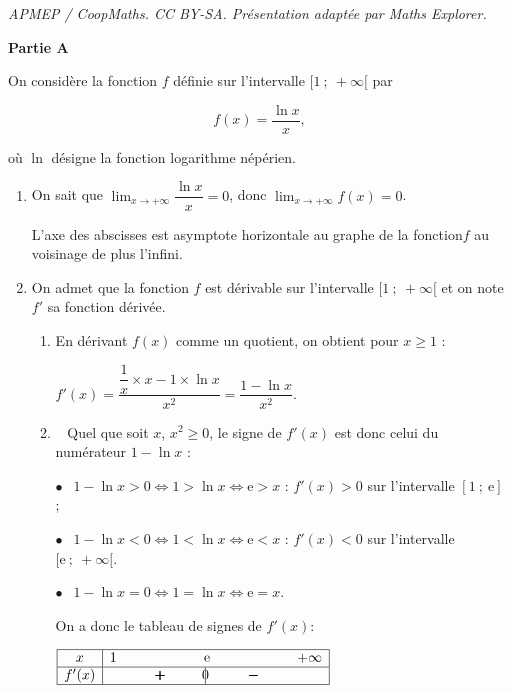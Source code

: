 \documentclass[10pt]{article}
\begin{document}
\noindent\textit{APMEP / CoopMaths. CC BY-SA. Présentation adaptée par Maths Explorer.}\par\medskip
\bigskip

\textbf{Partie A}

\medskip

On considère la fonction $f$ définie sur l'intervalle $[1~;~+\infty[$ par 

\[f(x) = \dfrac{\ln x}{x},\]

où $\ln$ désigne la fonction logarithme népérien.

\medskip

\begin{enumerate}
\item 
On sait que $\displaystyle\lim_{x \to + \infty} \dfrac{\ln x}{x} = 0$, donc $\displaystyle\lim_{x \to + \infty} f(x) = 0$.

L'axe des abscisses est asymptote horizontale au graphe de la fonction$f$ au voisinage de plus l'infini.
\item On admet que la fonction $f$ est dérivable sur l'intervalle $[1~;~+\infty[$ et on note $f'$ sa fonction dérivée.
	\begin{enumerate}
		\item 
En dérivant $f(x)$ comme un quotient, on obtient pour $x \geqslant 1$ :
		
$f'(x) = \dfrac{\dfrac{1}{x} \times x - 1 \times \ln x}{x^2} = \dfrac{1 - \ln x}{x^2}$.

		\item~ 
Quel que soit $x$,\: $x^2 \geqslant 0$, le signe de $f'(x)$ est donc celui du numérateur $1 - \ln x$ :

$\bullet~~$ $1 - \ln x > 0 \iff 1 > \ln x \iff \text{e} > x$ : $f'(x) > 0$ sur l'intervalle $[1~;~\text{e}]$ ;

$\bullet~~$ $1 - \ln x < 0 \iff 1 < \ln x \iff \text{e} < x$ : $f'(x) < 0$ sur l'intervalle $[\text{e}~;~+ \infty[$.

$\bullet~~$ $1 - \ln x = 0 \iff 1 = \ln x \iff \text{e} = x$.

On a donc le tableau de signes de $f'(x)$:

\begin{center}
\renewcommand{\arraystretch}{1.2}
\def\esp{\hspace*{1.5cm}}
$\begin{array}{|c | *{5}{c} |} 
\hline
x  & 1 & \esp & \text e & \esp  & +\infty \\
\hline
f'(x) &  & \pmb{+} &  \vline\hspace{-2.7pt}{0} & \pmb{-} &    \\
\hline
\end{array}$
\renewcommand{\arraystretch}{1}
\end{center}


\end{enumerate}
\end{enumerate}
\end{document}
